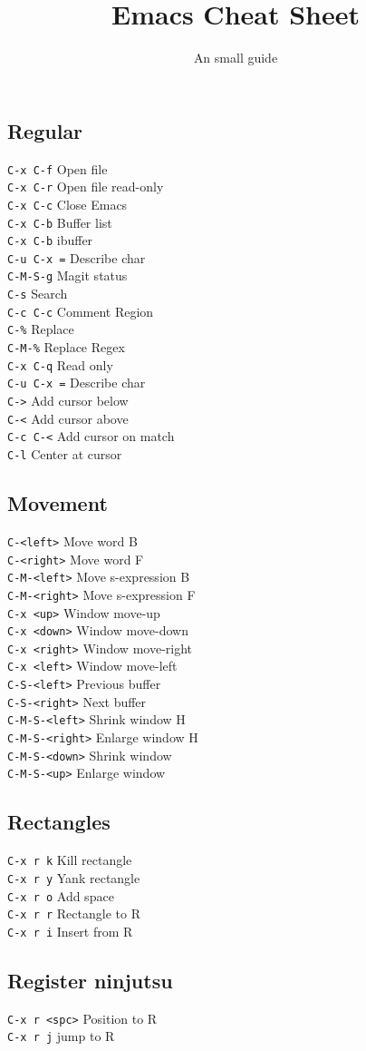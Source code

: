 \documentclass{article}
\title{\vspace{-1.5cm} Emacs Cheat Sheet}
\author{An small guide}
\date{}
\begin{document}
\newcommand{\command}[2]{
  \texttt{#1} \hfill #2 \\
}

\begin{multicols*}{4}
\maketitle
\section*{Regular}

\command{C-x C-f}{Open file}
\command{C-x C-r}{Open file read-only}
\command{C-x C-c}{Close Emacs}
\command{C-x C-b}{Buffer list}
\command{C-x C-b}{ibuffer}
\command{C-u C-x =}{Describe char}
\command{C-M-S-g}{Magit status}
\command{C-s}{Search}
\command{C-c C-c}{Comment Region}
\command{C-\%}{Replace}
\command{C-M-\%}{Replace Regex}
\command{C-x C-q}{Read only}
\command{C-u C-x =}{Describe char}
\command{C->}{Add cursor below}
\command{C-<}{Add cursor above}
\command{C-c C-<}{Add cursor on match}
\command{C-l}{Center at cursor}

\subsection*{Movement}

\command{C-<left>}{Move word B}
\command{C-<right>}{Move word F}
\command{C-M-<left>}{Move s-expression B}
\command{C-M-<right>}{Move s-expression F}
\command{C-x <up>}{Window move-up}
\command{C-x <down>}{Window move-down}
\command{C-x <right>}{Window move-right}
\command{C-x <left>}{Window move-left}
\command{C-S-<left>}{Previous buffer}
\command{C-S-<right>}{Next buffer}
\command{C-M-S-<left>}{Shrink window H}
\command{C-M-S-<right>}{Enlarge window H}
\command{C-M-S-<down>}{Shrink window}
\command{C-M-S-<up>}{Enlarge window}

\subsection*{Rectangles}
\command{C-x r k}{Kill rectangle}
\command{C-x r y}{Yank rectangle}
\command{C-x r o}{Add space}
\command{C-x r r}{Rectangle to R}
\command{C-x r i}{Insert from R}

\subsection*{Register ninjutsu}

\command{C-x r <spc>}{Position to R}
\command{C-x r j}{jump to R}


\end{multicols*}
\end{document}
